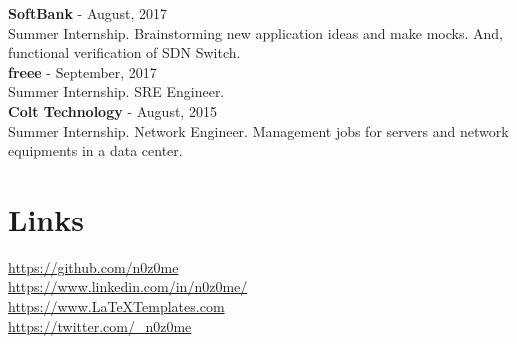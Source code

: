 \documentclass[11pt]{article} %
\begin{document}
\begin{paracol}{2}
\textbf{\color{subtitle}SoftBank} \hspace{0.5mm} {\color{subtitle} - August, 2017}\\
Summer Internship. Brainstorming new application ideas and make mocks. And, functional verification of SDN Switch.\\

\textbf{\color{subtitle}freee} \hspace{0.5mm} {\color{subtitle} - September, 2017}\\
Summer Internship. SRE Engineer.\\

\textbf{\color{subtitle}Colt Technology} \hspace{0.5mm} {\color{subtitle} - August, 2015}\\
Summer Internship. Network Engineer. Management jobs for servers and network equipments in a data center.\\

\vspace{1cm}


\section{Links}
{\faGithub} \hspace{1mm} \href{https://github.com/n0z0me}{https://github.com/n0z0me}\\ %
{\faLinkedinSquare} \hspace{1mm} \href{https://www.linkedin.com/in/n0z0me/}{https://www.linkedin.com/in/n0z0me/}\\ %
{\small\faDesktop} \hspace{0.8mm} \href{https://www.LaTeXTemplates.com}{https://www.LaTeXTemplates.com}\\ %
{\faTwitterSquare} \hspace{1mm} \href{https://twitter.com/\_n0z0me}{https://twitter.com/\_n0z0me}\\

\end{paracol}

\end{document}
